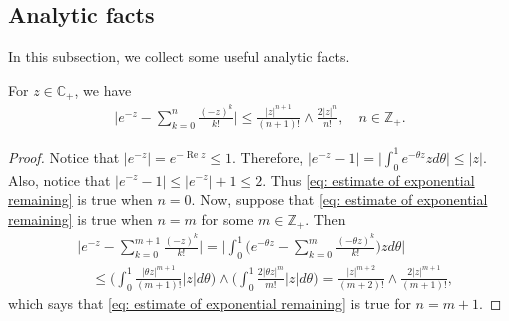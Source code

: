 \documentclass[EJP]{ejpecp} %
\begin{document}
\appendix
\section{ }
\subsection{Analytic facts}
In this subsection, we collect some useful analytic facts.
\begin{lemma}
  \label{lem: estimate of exponential remaining}
  For $z\in \mathbb C_+$,  we have
  \begin{align}
    \label{eq: estimate of exponential remaining}
    \Big|e^{-z} - \sum_{k=0}^n \frac{(-z)^k}{k!} \Big|
    \leq \frac{|z|^{n+1}}{(n+1)!} \wedge \frac{2|z|^{n}}{n!}, \quad n\in \mathbb Z_+.
  \end{align}
\end{lemma}
\begin{proof}
  Notice that $|e^{-z}| = e^{- \operatorname{Re} z} \leq 1$.
  Therefore, $ |e^{-z} - 1| = \Big| \int_0^1 e^{-\theta z} z d\theta\Big| \leq |z|. $
  Also, notice that $|e^{-z} - 1| \leq |e^{-z}|+1 \leq 2$.
  Thus \eqref{eq: estimate of exponential remaining} is true when $n = 0$.
  Now, suppose that \eqref{eq: estimate of exponential remaining} is true when $n = m$ for some $m \in \mathbb Z_+$.
  Then
  \begin{align}
    &\Big|e^{-z} - \sum_{k=0}^{m+1} \frac{(-z)^k}{k!}\Big|
      = \Big| \int_0^1\Big(e^{-\theta z} - \sum_{k=0}^m \frac{(-\theta z)^k}{k!} \Big) z d\theta \Big| \\
    & \quad \leq  \Big(\int_0^1 \frac{|\theta z|^{m+1}}{(m+1)!} |z| d\theta\Big) \wedge \Big(\int_0^1 \frac{2|\theta z|^{m}}{m!} |z| d\theta\Big)
      = \frac{|z|^{m+2}}{(m+2)!} \wedge \frac{2|z|^{m+1}}{(m+1)!},
  \end{align}
  which says that \eqref{eq: estimate of exponential remaining} is true for $n = m + 1$.
\end{proof}
\end{document}
